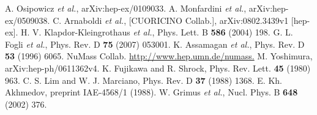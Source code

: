 \begin{thebibliography}{99}
A. Osipowicz \textit{et al.}, arXiv:hep-ex/0109033.
A. Monfardini \textit{et al.}, arXiv:hep-ex/0509038.
C. Arnaboldi \textit{et al.}, [CUORICINO Collab.], arXiv:0802.3439v1 [hep-ex].
H. V. Klapdor-Kleingrothaus \textit{et al.}, Phys. Lett. B \textbf{586} (2004) 198.
G. L. Fogli \textit{et al.}, Phys. Rev. D \textbf{75} (2007) 053001.
K. Assamagan \textit{et al.}, Phys. Rev. D \textbf{53} (1996) 6065.
NuMass Collab. \url{http://www.hep.umn.de/numass.}
M. Yoshimura, arXiv:hep-ph/0611362v4.
K. Fujikawa and R. Shrock, Phys. Rev. Lett. \textbf{45} (1980) 963.
C. S. Lim and W. J. Marciano, Phys. Rev. D \textbf{37} (1988) 1368.
E. Kh. Akhmedov, preprint IAE-4568/1 (1988).
W. Grimus \textit{et al.}, Nucl. Phys. B \textbf{648} (2002) 376.


\end{thebibliography}
